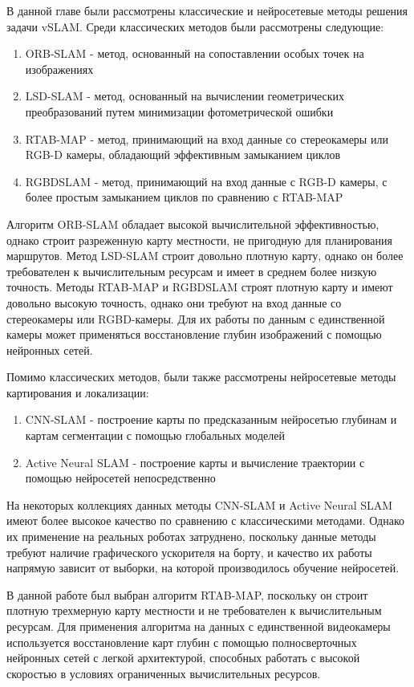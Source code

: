 \documentclass{mipt-thesis-ms}
\begin{document}
	В данной главе были рассмотрены классические и нейросетевые методы решения задачи vSLAM. Среди классических методов были рассмотрены следующие:
	
	\begin{enumerate}
		\item ORB-SLAM - метод, основанный на сопоставлении особых точек на изображениях
		\item LSD-SLAM - метод, основанный на вычислении геометрических преобразований путем минимизации фотометрической ошибки
		\item RTAB-MAP - метод, принимающий на вход данные со стереокамеры или RGB-D камеры, обладающий эффективным замыканием циклов
		\item RGBDSLAM - метод, принимающий на вход данные с RGB-D камеры, с более простым замыканием циклов по сравнению с RTAB-MAP
	\end{enumerate}

	Алгоритм ORB-SLAM обладает высокой вычислительной эффективностью, однако строит разреженную карту местности, не пригодную для планирования маршрутов. Метод LSD-SLAM строит довольно плотную карту, однако он более требователен к вычислительным ресурсам и имеет в среднем более низкую точность. Методы RTAB-MAP и RGBDSLAM строят плотную карту и имеют довольно высокую точность, однако они требуют на вход данные со стереокамеры или RGBD-камеры. Для их работы по данным с единственной камеры может применяться восстановление глубин изображений с помощью нейронных сетей.
	
	Помимо классических методов, были также рассмотрены нейросетевые методы картирования и локализации:
	
	\begin{enumerate}
		\item CNN-SLAM - построение карты по предсказанным нейросетью глубинам и картам сегментации с помощью глобальных моделей
		\item Active Neural SLAM - построение карты и вычисление траектории с помощью нейросетей непосредственно
	\end{enumerate}

	На некоторых коллекциях данных методы CNN-SLAM и Active Neural SLAM имеют более высокое качество по сравнению с классическими методами. Однако их применение на реальных роботах затруднено, поскольку данные методы требуют наличие графического ускорителя на борту, и качество их работы напрямую зависит от выборки, на которой производилось обучение нейросетей.
	
	В данной работе был выбран алгоритм RTAB-MAP, поскольку он строит плотную трехмерную карту местности и не требователен к вычислительным ресурсам. Для применения алгоритма на данных с единственной видеокамеры используется восстановление карт глубин с помощью полносверточных нейронных сетей с легкой архитектурой, способных работать с высокой скоростью в условиях ограниченных вычислительных ресурсов.
		
\end{document}
